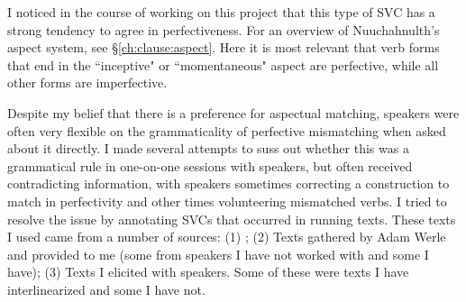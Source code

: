 \begin{comment}
\begin{tikzpicture}[sibling distance=10em,
  every node/.style = {shape=rectangle, align=center}]
\node (aspect) at (0,10) {aspect};
\node (pf) at (1,15) {perfective};
\node (impf) at (1,5) {imperfective};
\node (mo) at (8,15) {momentaneous};
\node (in) at (8,14) {inceptive};
\node (mo-grad-pf) at (8,13) {momentaneous-graduative-perf};
\node (in-grad-pf) at (8,12) {incep-grad-perf};
\node (dr-pf) at (8,11) {durative-perf};
\node (dr-grad-pf) at (8,10) {durative-grad-pf};
\node (rp-pf) at (8,9) {repet-perf};
\node (it-pf) at (8,8) {iter-perf};
\node (ct) at (5,6) {continuative};
\node (dr) at (5,5) {durative};
\node (rp) at (5,4) {repetative};
\node (it) at (5,3) {iterative};
\node (mo-grad) at (5,2) {mo-grad-pf};
\node (in-grad) at (5,1) {in-grad-pf};
\node (dr-grad) at (5,0) {dr-grad-pf};
\draw[->] (aspect) -- (pf);
\draw[->] (aspect) -- (impf);
\draw[->] (pf) -- (mo);
\draw[->] (pf) -- (in);
\draw[->] (pf) -- (mo-grad-pf);
\draw[->] (pf) -- (in-grad-pf);
\draw[->] (pf) -- (dr-pf);
\draw[->] (pf) -- (dr-grad-pf);
\draw[->] (pf) -- (rp-pf);
\draw[->] (pf) -- (it-pf);
\draw[->] (impf) -- (ct);
\draw[->] (impf) -- (dr);
\draw[->] (impf) -- (rp);
\draw[->] (impf) -- (it);
\draw[->] (impf) -- (mo-grad);
\draw[->] (impf) -- (in-grad);
\draw[->] (impf) -- (dr-grad);
\end{tikzpicture}
\end{comment}


I noticed in the course of working on this project that this type of SVC has a strong tendency to agree in perfectiveness. For an overview of Nuuchahnulth's aspect system, see \S\ref{ch:clause:aspect}. Here it is most relevant that verb forms that end in the ``inceptive" or ``momentaneous" aspect are perfective, while all other forms are imperfective.

Despite my belief that there is a preference for aspectual matching, speakers were often very flexible on the grammaticality of perfective mismatching when asked about it directly. I made several attempts to suss out whether this was a grammatical rule in one-on-one sessions with speakers, but often received contradicting information, with speakers sometimes correcting a construction to match in perfectivity and other times volunteering mismatched verbs. I tried to resolve the issue by annotating SVCs that occurred in running texts. These texts I used came from a number of sources: (1) \cite{sapir1939}; (2) Texts gathered by Adam Werle and provided to me (some from speakers I have not worked with and some I have); (3) Texts I elicited with speakers. Some of these were texts I have interlinearized and some I have not.

